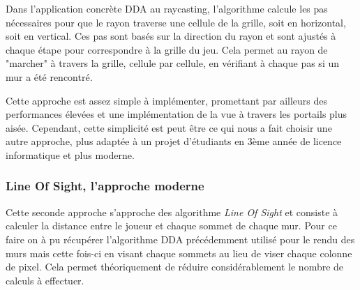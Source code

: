 \documentclass[11pt]{article}
\begin{document}
Dans l'application concrète DDA au raycasting, l'algorithme calcule les pas nécessaires pour que le rayon 
traverse une cellule de la grille, soit en horizontal, soit en vertical. Ces pas sont basés sur la direction du 
rayon et sont ajustés à chaque étape pour correspondre à la grille du jeu. Cela permet au rayon de "marcher" à travers 
la grille, cellule par cellule, en vérifiant à chaque pas si un mur a été rencontré.

\noindent Cette approche est assez simple à implémenter, promettant par ailleurs des performances élevées et 
une implémentation de la vue à travers les portails plus aisée. Cependant, cette simplicité est peut être ce qui 
nous a fait choisir une autre approche, plus adaptée à un projet d'étudiants en 3ème année de licence informatique et plus moderne.
 
\subsubsection{Line Of Sight, l'approche moderne}

Cette seconde approche s'approche des algorithme \textit{Line Of Sight} et consiste à calculer la distance entre le 
joueur et chaque sommet de chaque mur.
Pour ce faire on à pu récupérer l'algorithme DDA précédemment utilisé pour le rendu des murs mais cette fois-ci 
en visant chaque sommets au lieu de viser chaque colonne de pixel. Cela permet théoriquement de réduire considérablement 
le nombre de calculs à effectuer.
\end{document}
